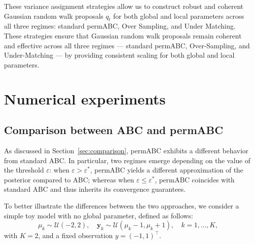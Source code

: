 \documentclass[11pt,a4paper]{article}
\def\obsdata{\mathbf{y}}
\theoremstyle{plain}
\theoremstyle{definition}
\theoremstyle{remark}
\begin{document}
These variance assignment strategies allow us to construct robust and coherent Gaussian random walk proposals \( q_t \) for both global and local parameters across all three regimes: standard permABC, Over Sampling, and Under Matching.
These strategies ensure that Gaussian random walk proposals remain coherent and effective across all three regimes — standard permABC, Over-Sampling, and Under-Matching — by providing consistent scaling for both global and local parameters.

\section{Numerical experiments}
\label{sec:numeric}

\subsection{Comparison between ABC and permABC}
\label{sec:abc_vs_permabc}

As discussed in Section~\ref{sec:comparison}, permABC exhibits a different behavior from standard ABC. In particular, two regimes emerge depending on the value of the threshold \( \varepsilon \): when \( \varepsilon > \varepsilon^* \), permABC yields a different approximation of the posterior compared to ABC; whereas when \( \varepsilon \leq \varepsilon^* \), permABC coincides with standard ABC and thus inherits its convergence guarantees.

To better illustrate the differences between the two approaches, we consider a simple toy model with no global parameter, defined as follows:
\[
\mu_k \sim \mathcal{U}(-2, 2), \quad \obsdata_k \sim \mathcal{U}(\mu_k - 1, \mu_k + 1), \quad k = 1, \dots, K,
\]
with \( K = 2 \), and a fixed observation \( y = (-1, 1)^\top \). 
\end{document}
